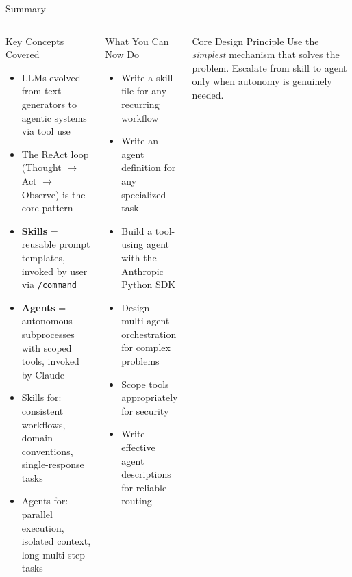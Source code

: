 \documentclass[aspectratio=169,xcolor=dvipsnames]{beamer}
\begin{document}
\begin{frame}{Summary}
    \begin{columns}
        \begin{block}{Key Concepts Covered}
            \begin{itemize}
                \item LLMs evolved from text generators to agentic systems via tool use
                \item The ReAct loop (Thought $\rightarrow$ Act $\rightarrow$ Observe) is the core pattern
                \item \textbf{Skills} = reusable prompt templates, invoked by user via \texttt{/command}
                \item \textbf{Agents} = autonomous subprocesses with scoped tools, invoked by Claude
                \item Skills for: consistent workflows, domain conventions, single-response tasks
                \item Agents for: parallel execution, isolated context, long multi-step tasks
            \end{itemize}
        \end{block}

        \begin{exampleblock}{What You Can Now Do}
            \begin{itemize}
                \item Write a skill file for any recurring workflow
                \item Write an agent definition for any specialized task
                \item Build a tool-using agent with the Anthropic Python SDK
                \item Design multi-agent orchestration for complex problems
                \item Scope tools appropriately for security
                \item Write effective agent descriptions for reliable routing
            \end{itemize}
        \end{exampleblock}
        \begin{alertblock}{Core Design Principle}
            Use the \emph{simplest} mechanism that solves the problem. Escalate from skill to agent only when autonomy is genuinely needed.
        \end{alertblock}
    \end{columns}
\end{frame}
\end{document}
